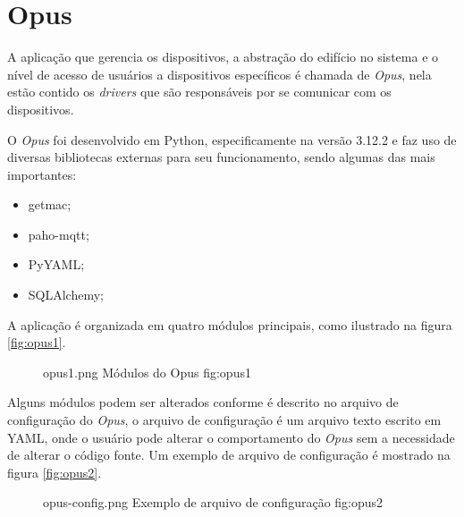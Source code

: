\chapter{\textbf{Opus}}
\label{opus}

A aplicação que gerencia os dispositivos, a abstração do edifício no sistema e o nível de acesso de usuários a dispositivos específicos
é chamada de \emph{Opus}, nela estão contido os \emph{drivers} que são responsáveis por se comunicar com os dispositivos.

O \emph{Opus} foi desenvolvido em Python, especificamente na versão 3.12.2 e faz uso de diversas bibliotecas externas para seu funcionamento,
sendo algumas das mais importantes:
\begin{itemize}
    \item getmac;
    \item paho-mqtt;
    \item PyYAML;
    \item SQLAlchemy;
\end{itemize}

A aplicação é organizada em quatro módulos principais, como ilustrado na figura \ref{fig:opus1}.
\begin{figure}[h!]
    {opus1.png}
    {Módulos do Opus}
    {fig:opus1}
\end{figure}

Alguns módulos podem ser alterados conforme é descrito no arquivo de configuração do \emph{Opus}, o arquivo de configuração é um arquivo texto
escrito em YAML, onde o usuário pode alterar o comportamento do \emph{Opus} sem a necessidade de alterar o código fonte.
Um exemplo de arquivo de configuração é mostrado na figura \ref{fig:opus2}.
\begin{figure}[h!]
    {opus-config.png}
    {Exemplo de arquivo de configuração}
    {fig:opus2}
\end{figure}
